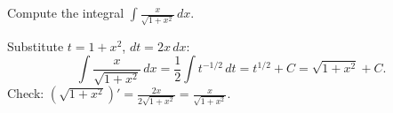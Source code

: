 
\begin{question}
Compute the integral $\displaystyle\int\frac{x}{\sqrt{1+x^2}}\,dx$.
\end{question}

\begin{solution}
Substitute $t=1+x^2$, $dt=2x\,dx$:
\[ \int\frac{x}{\sqrt{1+x^2}}\,dx=\frac12\int t^{-1/2}\,dt=t^{1/2}+C=\sqrt{1+x^2}+C. \]
Check: $\left(\sqrt{1+x^2}\right)'=\frac{2x}{2\sqrt{1+x^2}}=\frac{x}{\sqrt{1+x^2}}$.
\end{solution}
